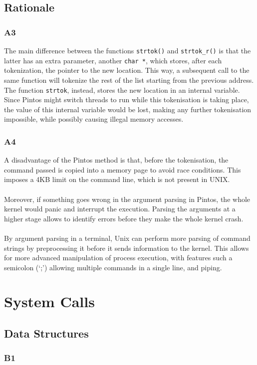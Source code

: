 \documentclass[a4wide, 11pt]{article}
\newcommand{\tx}{\texttt}
\begin{document}
\subsection{Rationale}
\subsubsection{A3}
The main difference between the functions \tx{strtok()} and \tx{strtok\_r()} is that the latter has an extra parameter, another \tx{char *}, which stores, after each tokenization, the pointer to the new location. This way, a subsequent call to the same function will tokenize the rest of the list starting from the previous address. The function \tx{strtok}, instead, stores the new location in an internal variable. Since Pintos might switch threads to run while this tokenisation is taking place, the value of this internal variable would be lost, making any further tokenisation impossible, while possibly causing illegal memory accesses.
\subsubsection{A4}
A disadvantage of the Pintos method is that, before the tokenisation, the command passed is copied into a memory page to avoid race conditions. This imposes a 4KB limit on the command line, which is not present in UNIX.
\\\\
Moreover, if something goes wrong  in the argument parsing in Pintos, the whole kernel would panic and interrupt the execution. Parsing the arguments at a higher stage allows to identify errors before they make the whole kernel crash.
\\\\
By argument parsing in a terminal, Unix can perform more parsing of command strings by preprocessing it before it sends information to the kernel. This allows for more advanced manipulation of process execution, with features such a semicolon (`;') allowing multiple commands in a single line, and piping.

\section{System Calls}
\subsection{Data Structures}
\subsubsection{B1}
\end{document}
